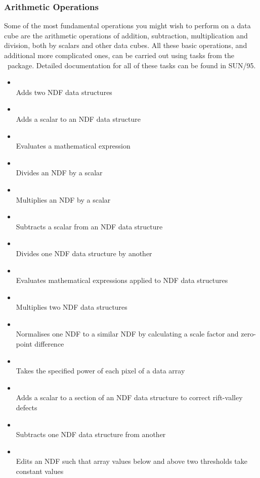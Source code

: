 \documentclass[twoside,11pt]{starlink}
\providecommand{\KAPPA}{{\footnotesize KAPPA}\normalsize}
\providecommand{\KAPPAref}{\xref{\KAPPA}{sun95}{}}
\begin{document}
\subsubsection{Arithmetic Operations}

Some of the most fundamental operations you might wish to perform on a
data cube are the arithmetic operations of addition, subtraction,
multiplication and division, both by scalars and other data cubes.  All
these basic operations, and additional more complicated ones, can be
carried out using tasks from the \KAPPAref\ package.
Detailed documentation for all of these tasks can be found
in SUN/95.

\begin{itemize}

\item{}\\
Adds two NDF data structures
\item{}\\
Adds a scalar to an NDF data structure
\item{}\\
Evaluates a mathematical expression
\item{}\\
Divides an NDF by a scalar
\item{}\\
Multiplies an NDF by a scalar
\item{}\\
Subtracts a scalar from an NDF data structure
\item{}\\
Divides one NDF data structure by another
\item{}\\
Evaluates mathematical expressions applied to NDF data structures
\item{}\\
Multiplies two NDF data structures
\item{}\\
Normalises one NDF to a similar NDF by calculating a scale factor and zero-point difference
\item{}\\
Takes the specified power of each pixel of a data array
\item{}\\
Adds a scalar to a section of an NDF data structure to correct rift-valley defects
\item{}\\
Subtracts one NDF data structure from another
\item{}\\
Edits an NDF such that array values below and above two thresholds take constant values
\end{itemize}
\end{document}
